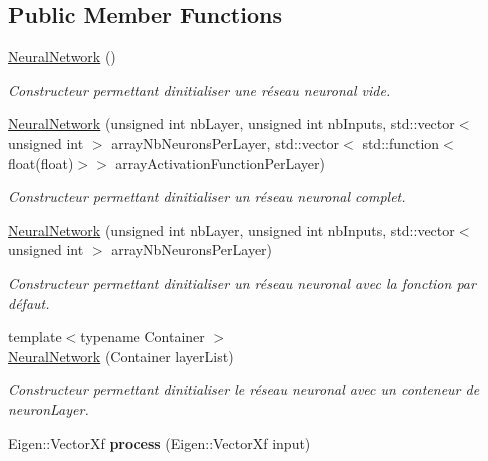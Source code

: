 \subsection*{Public Member Functions}
\begin{DoxyCompactItemize}
\item 
\mbox{\label{classNeuralNetwork_accce4a7728e89a009a9d4ca1758c9b9d}} 
\hyperlink{classNeuralNetwork_accce4a7728e89a009a9d4ca1758c9b9d}{Neural\+Network} ()
\begin{DoxyCompactList}\small\item\em Constructeur permettant d\textquotesingle{}initialiser une réseau neuronal vide. \end{DoxyCompactList}\item 
\hyperlink{classNeuralNetwork_a3caa6a6f94e1dda424149308752fe69a}{Neural\+Network} (unsigned int nb\+Layer, unsigned int nb\+Inputs, std\+::vector$<$ unsigned int $>$ array\+Nb\+Neurons\+Per\+Layer, std\+::vector$<$ std\+::function$<$ float(float)$>$$>$ array\+Activation\+Function\+Per\+Layer)
\begin{DoxyCompactList}\small\item\em Constructeur permettant d\textquotesingle{}initialiser un réseau neuronal complet. \end{DoxyCompactList}\item 
\hyperlink{classNeuralNetwork_aa150aec211344d7f64eac79c76275137}{Neural\+Network} (unsigned int nb\+Layer, unsigned int nb\+Inputs, std\+::vector$<$ unsigned int $>$ array\+Nb\+Neurons\+Per\+Layer)
\begin{DoxyCompactList}\small\item\em Constructeur permettant d\textquotesingle{}initialiser un réseau neuronal avec la fonction par défaut. \end{DoxyCompactList}\item 
{\footnotesize template$<$typename Container $>$ }\\\hyperlink{classNeuralNetwork_a7943bb4e9cb96aae048b236d4f1dd979}{Neural\+Network} (Container layer\+List)
\begin{DoxyCompactList}\small\item\em Constructeur permettant d\textquotesingle{}initialiser le réseau neuronal avec un conteneur de neuron\+Layer. \end{DoxyCompactList}\item 
\mbox{\label{classNeuralNetwork_a98cab3b3726fbf06dca316068c29c783}} 
Eigen\+::\+Vector\+Xf {\bfseries process} (Eigen\+::\+Vector\+Xf input)
\end{DoxyCompactItemize}
